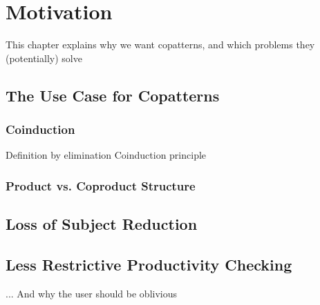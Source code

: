 \chapter{Motivation}
This chapter explains why we want copatterns, and which problems they (potentially) solve

\section{The Use Case for Copatterns}
\subsection{Coinduction}
Definition by elimination
Coinduction principle

\subsection{Product vs. Coproduct Structure}

\section{Loss of Subject Reduction}

\section{Less Restrictive Productivity Checking}
... And why the user should be oblivious

